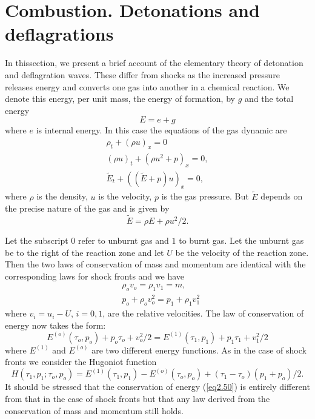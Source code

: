 \section{Combustion. Detonations and deflagrations}\label{chap2:sec2.10}
In this\pageoriginale section, we present a brief account of the elementary theory of detonation and deflagration waves. These differ from shocks as the increased pressure releases energy and converts one gas into another in a chemical reaction. We denote this energy, per unit mass, the energy of formation, by $g$ and the total energy
$$
E = e+ g
$$
where $e$ is internal energy. In this case the equations of the gas dynamic are
\begin{gather*}
\rho_t + (\rho u)_x = 0\\
(\rho u)_t + (\rho u^2 +p)_x = 0,\tag{2.47}\label{eq2.47}\\
\tilde{E}_t + ((\tilde{E} + p)u)_x = 0,
\end{gather*}
where $\rho$ is the density, $u$ is the velocity, $p$ is the gas pressure. But $\tilde{E}$ depends on the precise nature of the gas and is given by
$$
\tilde{E} = \rho E + \rho u^2 / 2.
$$

Let the subscript $0$ refer to unburnt gas and $1$ to burnt gas. Let the unburnt gas be to the right of the reaction zone and let $U$ be the velocity of the reaction zone. Then the two laws of conservation of mass and momentum are identical with the corresponding laws for shock fronts and we have 
\begin{align*}
& \rho_o v_o = \rho_1 v_1 = m, \tag{2.48}\label{eq2.48}\\
& p_o + \rho_o v^2_o = p_1 + \rho_1 v^2_1 \tag{2.49}\label{eq2.49}
\end{align*}\pageoriginale
where $v_i = u_i - U$, $i = 0,1$, are the relative velocities. The law of conservation of energy now takes the form:
\begin{equation*}
E^{(o)} (\tau_o, p_o) + p_o \tau_o + v^2_o / 2 = E^{(1)} (\tau_1, p_1) + p_1 \tau_1 + v^2 _1 / 2 \tag{2.50}\label{eq2.50}
\end{equation*}
where $E^{(1)}$ and $E^{(o)}$ are two different energy functions. As in the case of shock fronts we consider  the Hugoniot function
$$
H(\tau_1, p_1 ; \tau_o , p_o) = E^{(1)} (\tau_1, p_1) - E^{(o)} (\tau_o, p_o) + (\tau_1 - \tau_o) (p_1 + p_o) / 2.
$$
It should be stressed that the conservation of energy (\ref{eq2.50}) is entirely different from that in the case of shock fronts but that any law derived from the conservation of  mass and momentum still holds.

